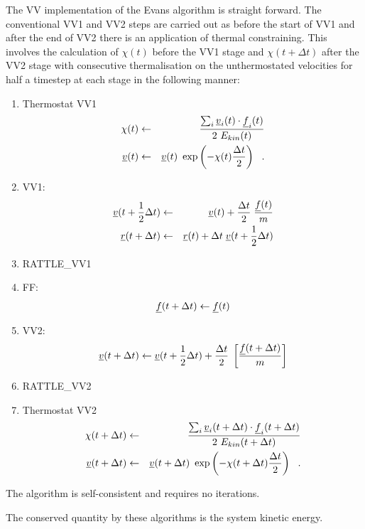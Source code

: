 The VV implementation of the Evans algorithm is straight forward.
The conventional VV1 and VV2 steps are carried out as before
the start of VV1 and after the end of VV2 there is an application of
thermal constraining.  This involves the calculation of $\chi (t)$
before the VV1 stage and $\chi (t+\Delta t)$ after the VV2 stage
with consecutive thermalisation on the unthermostated velocities
for half a timestep at each stage in the following manner:
\begin{enumerate}
\item Thermostat VV1
\begin{eqnarray}
\chi (t) &\leftarrow& \frac {\sum_{i} \mbox{$\underline{v}$}_{i}(t) \cdot \mbox{$\underline{f}$}_{i}(t)} {2~E_{kin}(t)} \nonumber \\
\mbox{$\underline{v}$}(t) &\leftarrow& \mbox{$\underline{v}$}(t)~\exp \left( -\chi (t) {\Delta t \over 2} \right)~~.
\end{eqnarray}
\item VV1:
\begin{eqnarray}
\mbox{$\underline{v}$}(t + {1 \over 2} \Delta t) &\leftarrow& \mbox{$\underline{v}$}(t) +
{\Delta t \over 2} \; {\mbox{$\underline{f}$}(t) \over m} \nonumber \\
\mbox{$\underline{r}$}(t + \Delta t) &\leftarrow& \mbox{$\underline{r}$}(t) + \Delta t \;
\mbox{$\underline{v}$}(t + {1 \over 2} \Delta t)
\end{eqnarray}
\item RATTLE\_VV1
\item FF:
\begin{equation}
\mbox{$\underline{f}$}(t + \Delta t) \leftarrow \mbox{$\underline{f}$}(t)
\end{equation}
\item VV2:
\begin{equation}
\mbox{$\underline{v}$}(t + \Delta t) \leftarrow \mbox{$\underline{v}$}(t + {1 \over 2} \Delta t) +
{\Delta t \over 2} \; \left[{\mbox{$\underline{f}$}(t + \Delta t) \over m} \right]
\end{equation}
\item RATTLE\_VV2
\item Thermostat VV2
\begin{eqnarray}
\chi (t + \Delta t) &\leftarrow& \frac {\sum_{i} \mbox{$\underline{v}$}_{i}(t +
\Delta t) \cdot \mbox{$\underline{f}$}_{i}(t + \Delta t)} {2~E_{kin}(t + \Delta t)} \nonumber \\
\mbox{$\underline{v}$}(t + \Delta t) &\leftarrow& \mbox{$\underline{v}$}(t + \Delta t)~
\exp \left( -\chi (t + \Delta t) {\Delta t \over 2} \right)~~.
\end{eqnarray}
\end{enumerate}
The algorithm is self-consistent and requires no iterations.

The conserved quantity by these algorithms is the system kinetic energy.

